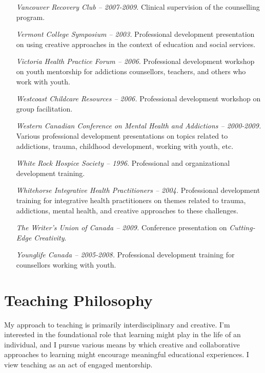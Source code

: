 \documentclass[10pt,DIV09,letterpaper,oneside,headsepline]{scrreprt}
\begin{document}
\begin{itemize}
\item [\textit{Vancouver Recovery Club -- 2007-2009.}]
Clinical supervision of the counselling program.

\item [\textit{Vermont College Symposium -- 2003.}]
Professional development presentation on using creative approaches in the context of education and social services.

\item [\textit{Victoria Health Practice Forum -- 2006.}]
Professional development workshop on youth mentorship for addictions counsellors, teachers, and others who work with youth.

\item [\textit{Westcoast Childcare Resources -- 2006.}]
Professional development workshop on group facilitation.

\item [\textit{Western Canadian Conference on Mental Health and Addictions -- 2000-2009.}]
Various professional development presentations on topics related to addictions, trauma, childhood development, working with youth, etc.

\item [\textit{White Rock Hospice Society -- 1996.}]
Professional and organizational development training.

\item [\textit{Whitehorse Integrative Health Practitioners -- 2004.}]
Professional development training for integrative health practitioners on themes related to trauma, addictions, mental health, and creative approaches to these challenges.

\item [\textit{The Writer's Union of Canada -- 2009.}]
Conference presentation on \textit{Cutting-Edge Creativity}.

\item [\textit{Younglife Canada -- 2005-2008.}]
Professional development training for counsellors working with youth.



\end{itemize}

\chapter{Teaching Philosophy}

My approach to teaching is primarily interdisciplinary and creative. I'm interested in the foundational role that learning might play in the life of an individual, and I pursue various means by which creative and collaborative approaches to learning might encourage meaningful educational experiences. I view teaching as an act of engaged mentorship.
\end{document}
